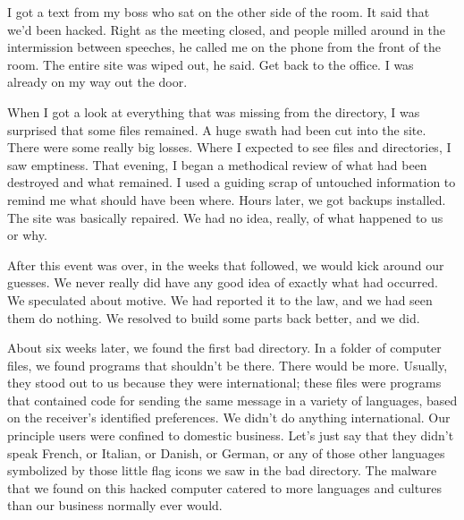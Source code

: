 I got a text from my boss who sat on the other side of the room.  It said that we'd been hacked.  Right as the meeting closed, and people milled around in the intermission between speeches, he called me on the phone from the front of the room.  The entire site was wiped out, he said.  Get back to the office.  I was already on my way out the door.

When I got a look at everything that was missing from the directory, I was surprised that some files remained.  A huge swath had been cut into the site.  There were some really big losses.  Where I expected to see files and directories, I saw emptiness.  That evening, I began a methodical review of what had been destroyed and what remained.  I used a guiding scrap of untouched information to remind me what should have been where.  Hours later, we got \gls{backup}s installed.  The site was basically repaired.  We had no idea, really, of what happened to us or why.

After this event was over, in the weeks that followed, we would kick around our guesses.  We never really did have any good idea of exactly what had occurred.  We speculated about motive.  We had reported it to the law, and we had seen them do nothing.  We resolved to build some parts back better, and we did.

About six weeks later, we found the first bad directory.  In a folder of computer files, we found programs that shouldn't be there.  There would be more.  Usually, they stood out to us because they were international; these files were programs that contained code for sending the same message in a variety of languages, based on the receiver's identified preferences.  We didn't do anything international.  Our principle users were confined to domestic business.  Let's just say that they didn't speak French, or Italian, or Danish, or German, or any of those other languages symbolized by those little flag icons we saw in the bad directory.  The \gls{malware} that we found on this hacked computer catered to more languages and cultures than our business normally ever would.

